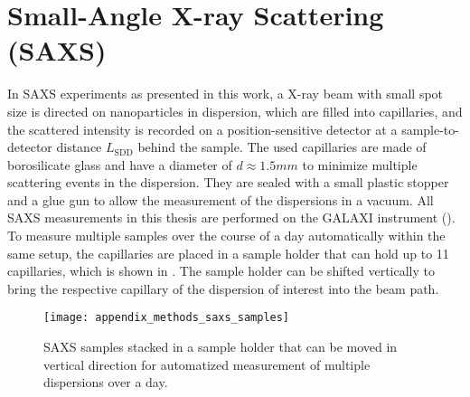 \documentclass[\main/dresen_thesis.tex]{subfiles}
\begin{document}
  \section{Small-Angle X-ray Scattering (SAXS)}
    \label{ch:methods:saxs}
    In SAXS experiments as presented in this work, a X-ray beam with small spot size is directed on nanoparticles in dispersion, which are filled into capillaries, and the scattered intensity is recorded on a position-sensitive detector at a sample-to-detector distance $L_\mathrm{SDD}$ behind the sample.
    The used capillaries are made of borosilicate glass and have a diameter of $d \approx 1.5\unit{mm}$ to minimize multiple scattering events in the dispersion.
    They are sealed with a small plastic stopper and a glue gun to allow the measurement of the dispersions in a vacuum.
    All SAXS measurements in this thesis are performed on the GALAXI instrument ().
    To measure multiple samples over the course of a day automatically within the same setup, the capillaries are placed in a sample holder that can hold up to 11 capillaries, which is shown in .
    The sample holder can be shifted vertically to bring the respective capillary of the dispersion of interest into the beam path.
    \begin{figure}[tb]
      \centering
      \texttt{[image: appendix\_methods\_saxs\_samples]}
      \caption{\label{fig:methods:saxs:samples} SAXS samples stacked in a sample holder that can be moved in vertical direction for automatized measurement of multiple dispersions over a day. }
    \end{figure}
\end{document}
